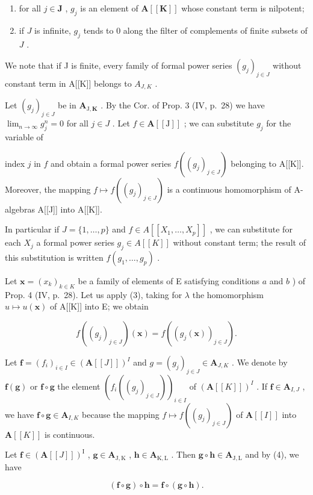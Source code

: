\begin{enumerate}
\def\labelenumi{(\roman{enumi})}
\item
  for all \(j \in \mathbf{J}\) , \(g_j\) is an element of \(\mathbf{A}[[\mathbf{K}]]\) whose constant term is nilpotent;
\item
  if \(J\) is infinite, \(g_{j}\) tends to 0 along the filter of complements of finite subsets of \(J\) .
\end{enumerate}

We note that if J is finite, every family of formal power series \((g_{j})_{j\in J}\) without constant term in A{[}{[}K{]}{]} belongs to \(A_{J,K}\) .

Let \((g_j)_{j\in J}\) be in \(\mathbf{A}_{\mathrm{J},\mathbf{K}}\) . By the Cor. of Prop. 3 (IV, p.~28) we have \(\lim_{n\to \infty}g_j^n = 0\) for all \(j\in J\) . Let \(f\in \mathbf{A}[[\mathrm{J}]]\) ; we can substitute \(g_{j}\) for the variable of

index \(j\) in \(f\) and obtain a formal power series \(f((g_j)_{j \in J})\) belonging to A{[}{[}K{]}{]}. Moreover, the mapping \(f \mapsto f((g_j)_{j \in J})\) is a continuous homomorphism of A-algebras A{[}{[}J{]}{]} into A{[}{[}K{]}{]}.

In particular if \(J = \{1, \ldots, p\}\) and \(f \in A[[X_1, \ldots, X_p]]\) , we can substitute for each \(X_j\) a formal power series \(g_j \in A[[K]]\) without constant term; the result of this substitution is written \(f(g_1, \ldots, g_p)\) .

Let \(\mathbf{x} = (x_k)_{k\in K}\) be a family of elements of E satisfying conditions \(a\) and \(b\) ) of Prop. 4 (IV, p.~28). Let us apply (3), taking for \(\lambda\) the homomorphism \(u\mapsto u(\mathbf{x})\) of A{[}{[}K{]}{]} into E; we obtain

\[
f \left(\left(g _ {j}\right) _ {j \in J}\right) (\mathbf {x}) = f \left(\left(g _ {j} (\mathbf {x})\right) _ {j \in J}\right).\tag{4}
\]

Let \(\mathbf{f} = (f_i)_{i\in I}\in (\mathbf{A}[[J]])^I\) and \(g = (g_j)_{j\in J}\in \mathbf{A}_{J,K}\) . We denote by \(\mathbf{f}(\mathbf{g})\) or \(\mathbf{f}\circ \mathbf{g}\) the element \((f_{i}((g_{j})_{j\in J}))_{i\in I}\) of \((\mathbf{A}[[K]])^I\) . If \(\mathbf{f}\in \mathbf{A}_{I,J}\) , we have \(\mathbf{f}\circ \mathbf{g}\in \mathbf{A}_{I,K}\) because the mapping \(f\mapsto f((g_j)_{j\in J})\) of \(\mathbf{A}[[I]]\) into \(\mathbf{A}[[K]]\) is continuous.

Let \(\mathbf{f} \in (\mathbf{A}[[J]])^{\mathrm{I}}\) , \(\mathbf{g} \in \mathbf{A}_{\mathrm{J},\mathrm{K}}\) , \(\mathbf{h} \in \mathbf{A}_{\mathrm{K},\mathrm{L}}\) . Then \(\mathbf{g} \circ \mathbf{h} \in \mathbf{A}_{\mathrm{J},\mathrm{L}}\) and by (4), we have

\[
(\mathbf {f} \circ \mathbf {g}) \circ \mathbf {h} = \mathbf {f} \circ (\mathbf {g} \circ \mathbf {h}).\tag{5}
\]

